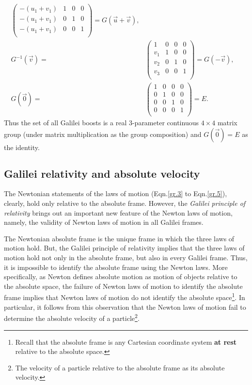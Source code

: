 \begin{small}
\begin{align}
\begin{pmatrix}
-(u_1+v_1)&1&0&0\\
-(u_1+v_1)&0&1&0\\
-(u_1+v_1)&0&0&1\\
\end{pmatrix}
={ G(\vec{u}+\vec{v})},\\
{G}^{-1}(\vec{v})=&
\begin{pmatrix} 1&0&0&0\\
v_1&1&0&0\\
v_2&0&1&0\\
v_3&0&0&1\\
\end{pmatrix}={G}(-\vec{v}), \quad \\
{G}(\vec{0})=&
\begin{pmatrix} 1&0&0&0\\
0&1&0&0\\
0&0&1&0\\
0&0&0&1\\
\end{pmatrix}={E}.
\end{align}
Thus the set of all Galilei boosts is a real 3-parameter
continuous $4\times 4$ matrix group (under matrix
multiplication as the group composition) and ${G}
(\vec{0})= {E}$ as the identity.\ebx
 \end{small}
 
 \subsection{Galilei relativity and absolute
velocity}
The Newtonian statements of the laws of motion 
(Eqn.\eqref{gr.3} to Eqn.\eqref{gr.5}), clearly, hold only 
relative to the absolute frame. However, the 
\textsl{Galilei principle of relativity} brings out an 
important new feature of the Newton laws of motion, namely, 
the validity of Newton laws of motion in all Galilei frames.

The Newtonian absolute frame is the unique 
frame in which the three laws of motion hold. But, the 
Galilei principle of relativity implies that the three laws 
of motion hold not only in the absolute frame, but also 
in every Galilei frame. Thus, it is impossible to 
identify the absolute frame using the Newton laws. More 
specifically, as Newton defines absolute motion as motion of 
objects relative to the absolute space, the failure of 
Newton laws of motion to identify the absolute frame implies 
that Newton laws of motion do not identify the absolute 
space\footnote{Recall that the absolute frame is any 
Cartesian coordinate system \textbf{at  rest} relative to 
the absolute space.}. In particular, it follows from this 
observation that the Newton laws of motion fail to determine 
the absolute velocity of a particle\footnote{The velocity of 
a particle relative to the absolute frame as its absolute 
velocity.}.

